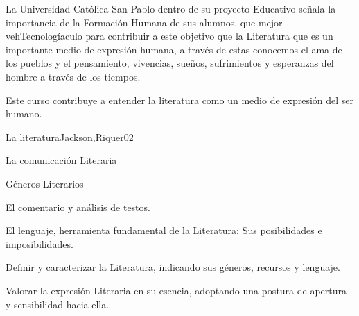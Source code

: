 \begin{syllabus}


\begin{justification}
La Universidad Católica San Pablo dentro de su proyecto Educativo señala la importancia de la Formación Humana de sus alumnos, que mejor vehTecnologíaculo para contribuir a este objetivo que la Literatura que es un importante medio de expresión humana, a través de estas  conocemos el ama de los pueblos y el pensamiento, vivencias, sueños, sufrimientos y esperanzas del hombre a través de los tiempos.
\end{justification}

\begin{goals}
\item Este curso contribuye a entender la literatura como un medio de expresión del ser humano.
\end{goals}

\begin{outcomes}
\end{outcomes}

\begin{unit}{La literatura}{Jackson,Riquer}{0}{2}
\begin{topics}
	\item La comunicación Literaria
	\item Géneros Literarios
	\item El comentario y análisis de testos.
	\item El lenguaje, herramienta fundamental de la Literatura: Sus posibilidades e imposibilidades.
\end{topics}
\begin{unitgoals}
	\item Definir y caracterizar la Literatura, indicando sus géneros, recursos y lenguaje.
	\item Valorar la expresión Literaria en su esencia, adoptando una postura de apertura y sensibilidad hacia ella.
\end{unitgoals}
\end{unit}


\end{syllabus}
